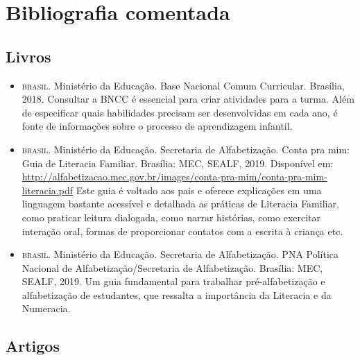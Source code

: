 \documentclass[11pt]{extarticle}
\begin{document}
\section{Bibliografia comentada}

\subsection{Livros}

\begin{itemize}
\item \textsc{brasil}. Ministério da Educação. Base Nacional Comum Curricular. Brasília, 2018.
Consultar a BNCC é essencial para criar atividades para a turma. Além de especificar 
quais habilidades precisam ser desenvolvidas em cada ano, é fonte de informações sobre 
o processo de aprendizagem infantil. 

\item \textsc{brasil}. Ministério da Educação. Secretaria de Alfabetização. Conta pra mim: Guia de Literacia Familiar. 
Brasília: MEC, SEALF, 2019. Disponível em: \url{http://alfabetizacao.mec.gov.br/images/conta-pra-mim/conta-pra-mim-literacia.pdf}
Este guia é voltado aos pais e oferece explicações em uma linguagem bastante acessível e detalhada as práticas de Literacia Familiar, 
como praticar leitura dialogada, como narrar histórias, como exercitar interação oral, formas de proporcionar contatos com a escrita à criança etc. 
 
\item \textsc{brasil}. Ministério da Educação. Secretaria de Alfabetização. PNA Política Nacional de Alfabetização/Secretaria 
de Alfabetização. Brasília: MEC, SEALF, 2019.
Um guia fundamental para trabalhar pré-alfabetização e alfabetização de estudantes, que ressalta a importância da Literacia e da Numeracia. 


\end{itemize}

\subsection{Artigos}
\end{document}
